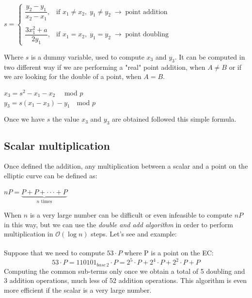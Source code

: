 \begin{center} 
	$s=\begin{cases} \dfrac{y_2-y_1}{x_2-x_1}, & \mbox{if } x_1\neq x_2, \; y_1\neq y_2 \;\rightarrow \; \text{point addition}\\ \\ \dfrac{3x_1^2+a}{2y_1}, & \mbox{if } x_1= x_2, \; y_1= y_2 \;\rightarrow \; \text{point doubling} \end{cases}$ 
\end{center}
Where $s$ is a dummy variable, used to compute $x_3$ and $y_3$. It can be computed in two different way if we are performing a "real" point addition, when $A\neq B$ or if we are looking for the double of a point, when $A= B$.
\begin{center} 
	$ x_3=s^2-x_1-x_2  \quad$ mod $p$\\
	$y_3=s(x_1-x_3)-y_1  \quad$mod $p$
\end{center}
Once we have $s$ the value $x_3$ and $y_3$ are obtained followed this simple formula.


\subsection{Scalar multiplication}
Once defined the addition, any multiplication between a scalar and a point on the elliptic curve can be defined as:
\begin{center} 
	$ nP=\underbrace{
		P+P+\cdot \cdot \cdot+P
	}_{n\text{ times}}$
\end{center}
When $n$ is a very large number can be difficult or even infeasible to compute $nP$ in this way, but we can use the \textit{double and add algorithm} in order to perform multiplication in $\mathcal{O}(\log{}n)$ steps. Let's see and example:
\\ \\
Suppose that we need to compute $53 \cdot P$ where P is a point on the EC:
\begin{equation*}
53 \cdot P = 110101_{base\, 2} \cdot P = 2^{5}\cdot P + 2^{4}\cdot P + 2^{2}\cdot P + P
\end{equation*}
Computing the common sub-terms only once we obtain a total of 5 doubling and 3 addition operations, much less of 52 addition operations. This algorithm is even more efficient if the scalar is a very large number.

